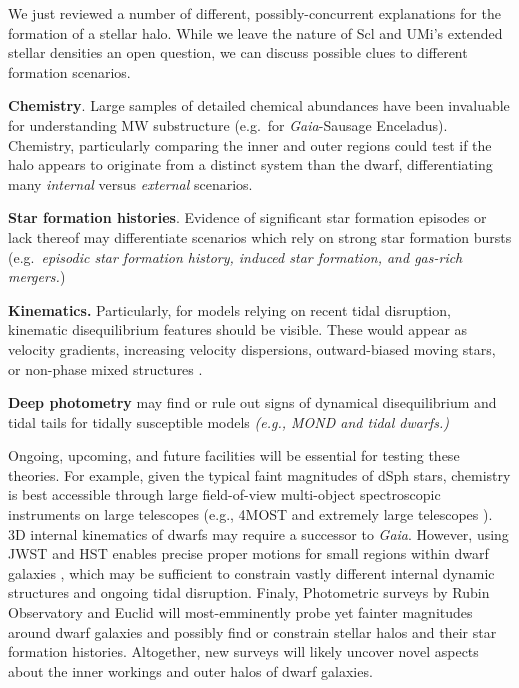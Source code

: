 We just reviewed a number of different, possibly-concurrent explanations
for the formation of a stellar halo. While we leave the nature of Scl
and UMi's extended stellar densities an open question, we can discuss
possible clues to different formation scenarios.

\textbf{Chemistry}. Large samples of detailed chemical abundances have
been invaluable for understanding MW substructure (e.g.~for
\emph{Gaia}-Sausage Enceladus). Chemistry, particularly comparing the
inner and outer regions could test if the halo appears to originate from
a distinct system than the dwarf, differentiating many \emph{internal}
versus \emph{external} scenarios.

\textbf{Star formation histories}. Evidence of significant star
formation episodes or lack thereof may differentiate scenarios which
rely on strong star formation bursts (e.g.~\emph{episodic star formation
history, induced star formation, and gas-rich mergers.})

\textbf{Kinematics.} Particularly, for models relying on recent tidal
disruption, kinematic disequilibrium features should be visible. These
would appear as velocity gradients, increasing velocity dispersions,
outward-biased moving stars, or non-phase mixed structures
\citep[e.g,][]{kroupa1997, read+2006, sanchez-salcedo+hernandez2007}.

\textbf{Deep photometry} may find or rule out signs of dynamical
disequilibrium and tidal tails for tidally susceptible models
\emph{(e.g., MOND and tidal dwarfs.)}

Ongoing, upcoming, and future facilities will be essential for testing
these theories. For example, given the typical faint magnitudes of dSph
stars, chemistry is best accessible through large field-of-view
multi-object spectroscopic instruments on large telescopes (e.g., 4MOST
and extremely large telescopes \citet{skuladottir+2023}). 3D internal
kinematics of dwarfs may require a successor to \emph{Gaia}. However,
using JWST and HST enables precise proper motions for small regions
within dwarf galaxies \citep[e.g.,][]{vitral+2025}, which may be
sufficient to constrain vastly different internal dynamic structures and
ongoing tidal disruption. Finaly, Photometric surveys by Rubin
Observatory and Euclid will most-emminently probe yet fainter magnitudes
around dwarf galaxies and possibly find or constrain stellar halos and
their star formation histories. Altogether, new surveys will likely
uncover novel aspects about the inner workings and outer halos of dwarf
galaxies.

